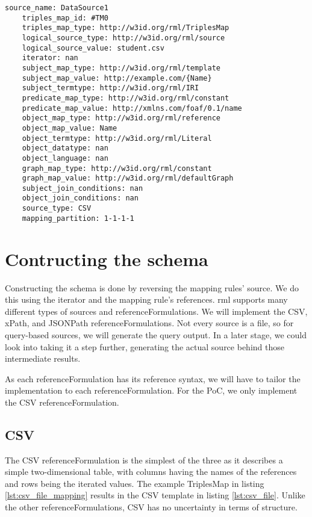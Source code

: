 \begin{lstlisting}[caption={Example of a mapping rule in Morph-KGC}, label={lst:mapping_rule}, captionpos=b, basicstyle=\small]
    source_name: DataSource1 
    triples_map_id: #TM0
    triples_map_type: http://w3id.org/rml/TriplesMap
    logical_source_type: http://w3id.org/rml/source
    logical_source_value: student.csv
    iterator: nan
    subject_map_type: http://w3id.org/rml/template
    subject_map_value: http://example.com/{Name}
    subject_termtype: http://w3id.org/rml/IRI
    predicate_map_type: http://w3id.org/rml/constant
    predicate_map_value: http://xmlns.com/foaf/0.1/name
    object_map_type: http://w3id.org/rml/reference
    object_map_value: Name
    object_termtype: http://w3id.org/rml/Literal
    object_datatype: nan
    object_language: nan
    graph_map_type: http://w3id.org/rml/constant
    graph_map_value: http://w3id.org/rml/defaultGraph
    subject_join_conditions: nan
    object_join_conditions: nan
    source_type: CSV
    mapping_partition: 1-1-1-1
\end{lstlisting}

\section{Contructing the schema}
\label{section:constructing_schema}
Constructing the schema is done by reversing the mapping rules' source. We do this using the iterator and the mapping rule's references. \acrshort{rml} supports many different types of sources and referenceFormulations. We will implement the CSV, xPath, and JSONPath referenceFormulations. Not every source is a file, so for query-based sources, we will generate the query output. In a later stage, we could look into taking it a step further, generating the actual source behind those intermediate results.

As each referenceFormulation has its reference syntax, we will have to tailor the implementation to each referenceFormulation. For the PoC, we only implement the CSV referenceFormulation. 

\subsection{CSV}
\label{subsection:csv}
The CSV referenceFormulation is the simplest of the three as it describes a simple two-dimensional table, with columns having the names of the references and rows being the iterated values. The example TriplesMap in listing \ref{lst:csv_file_mapping} results in the CSV template in listing \ref{lst:csv_file}. Unlike the other referenceFormulations, CSV has no uncertainty in terms of structure.

